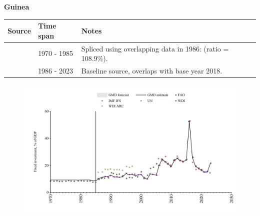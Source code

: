\documentclass[12pt,a4paper,landscape]{article}
\begin{document}
\begin{adjustbox}{max totalsize={\paperwidth}{\paperheight},center}
\begin{minipage}[t][\textheight][t]{\textwidth}
\vspace*{0.5cm}
{}
\begin{center}
{\Large\bfseries Guinea}
\end{center}
\vspace{0.5cm}
\begin{table}[H]
\centering
\small
\begin{tabular}{|l|l|l|}
\hline
\textbf{Source} & \textbf{Time span} & \textbf{Notes} \\
\hline
\rowcolor{white}\cite{UN}& 1970 - 1985 &Spliced using overlapping data in 1986: (ratio = 108.9\%).\\
\rowcolor{lightgray}\cite{WDI}& 1986 - 2023 &Baseline source, overlaps with base year 2018.\\
\hline
\end{tabular}
\end{table}
\begin{figure}[H]
\centering
\includegraphics[width=\textwidth,height=0.6\textheight,keepaspectratio]{graphs/GIN_finv_GDP.pdf}
\end{figure}
\end{minipage}
\end{adjustbox}
\end{document}
